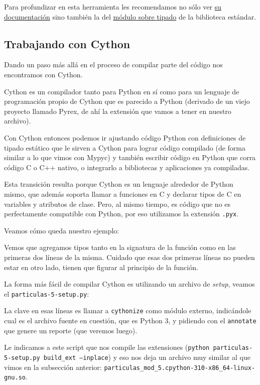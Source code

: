 Para profundizar en esta herramienta les recomendamos no sólo ver \href{https://mypy-lang.org/}{su documentación} sino también la del \href{https://docs.python.org/es/dev/library/typing.html}{módulo sobre tipado} de la biblioteca estándar.


\subsection{Trabajando con Cython}

Dando un paso más allá en el proceso de compilar parte del código nos encontramos con Cython.

Cython es un compilador tanto para Python en sí como para un lenguaje de programación propio de Cython que es parecido a Python (derivado de un viejo proyecto llamado Pyrex, de ahí la extensión que vamos a tener en nuestro archivo).

Con Cython entonces podemos ir ajustando código Python con definiciones de tipado estático que le sirven a Cython para lograr código compilado (de forma similar a lo que vimos con Mypyc) y también escribir código en Python que corra código C o C++ nativo, o integrarlo a bibliotecas y aplicaciones ya compiladas.

Esta transición resulta porque Cython es un lenguaje alrededor de Python mismo, que además soporta llamar a funciones en C y declarar tipos de C en variables y atributos de clase. Pero, al mismo tiempo, es código que no es perfectamente compatible con Python, por eso utilizamos la extensión \texttt{.pyx}.

Veamos cómo queda nuestro ejemplo:


Vemos que agregamos tipos tanto en la signatura de la función como en las primeras dos líneas de la misma. Cuidado que esas dos primeras líneas no pueden estar en otro lado, tienen que figurar al principio de la función.

La forma más fácil de compilar Cython es utilizando un archivo de \textit{setup}, veamos el \texttt{particulas-5-setup.py}:


La clave en esas líneas es llamar a \texttt{cythonize} como módulo externo, indicándole cual es el archivo fuente en cuestión, que es Python 3, y pidiendo con el \texttt{annotate} que genere un reporte (que veremos luego).

Le indicamos a este script que nos compile las extensiones (\texttt{python particulas-5-setup.py build\_ext --inplace}) y eso nos deja un archivo muy similar al que vimos en la subsección anterior: \texttt{particulas\_mod\_5.cpython-310-x86\_64-linux-gnu.so}.

